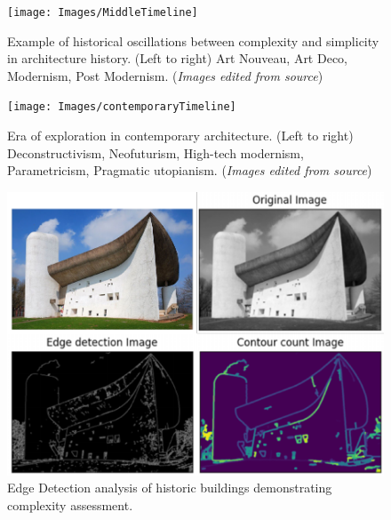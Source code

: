     \begin{figure}[htb]
    \centering
    \texttt{[image: Images/MiddleTimeline]}
    \caption{Example of historical oscillations between complexity and simplicity in architecture history. (Left to right) Art Nouveau, Art Deco, Modernism, Post Modernism. (\textit{Images edited from source})}
    \label{fig:Middletimeline}
    \end{figure}

    \begin{figure}[htb]
    \centering
    \texttt{[image: Images/contemporaryTimeline]}
    \caption{Era of exploration in contemporary architecture. (Left to right) Deconstructivism, Neofuturism, High-tech modernism, Parametricism, Pragmatic utopianism. (\textit{Images edited from source})}
    \label{fig:contemporarytimeline}
    \end{figure}

    \begin{figure}[htb]
    \centering
    \includegraphics[width= \linewidth]{Images/ComplexityPlotHistoryCICA}
    \caption{Edge Detection analysis of historic buildings demonstrating complexity assessment.}
    \label{fig:ComplexityPlotHistory}
    \end{figure}


